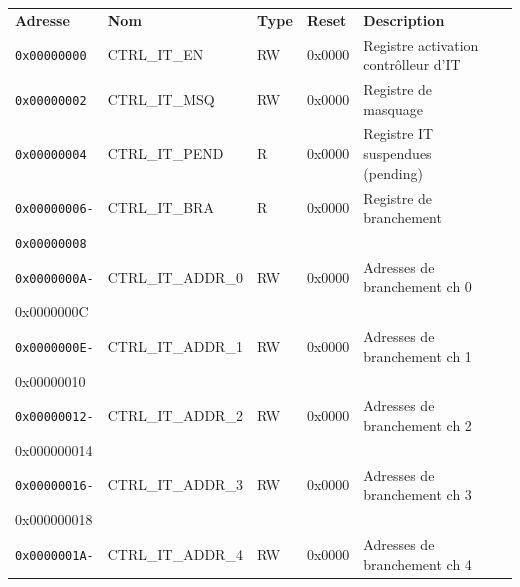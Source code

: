 \begin{table}[H]
	\centering
	\begin{tabular}{llllll}
		\hline
		\addlinespace[1ex] %
		\textbf{Adresse}     & \textbf{Nom}           & \textbf{Type} & \textbf{Reset} & \textbf{Description}                 \\
		\rhline
		\texttt{0x00000000}  & CTRL\_IT\_EN           & RW            & 0x0000         & Registre activation contrôlleur d'IT \\
		\rhline
		\texttt{0x00000002}  & CTRL\_IT\_MSQ          & RW            & 0x0000         & Registre de masquage                 \\
		\rhline
		\texttt{0x00000004}  & CTRL\_IT\_PEND         & R             & 0x0000         & Registre IT suspendues (pending)     \\
		\rhline
		\texttt{0x00000006-} & CTRL\_IT\_BRA          & R             & 0x0000         & Registre de branchement              \\
		\texttt{0x00000008}  &                        &               &                &                                      \\
		\rhline
		\texttt{0x0000000A-} & CTRL\_IT\_ADDR\_0      & RW            & 0x0000         & Adresses de branchement ch 0         \\
		{0x0000000C}         &                        &               &                &                                      \\
		\rhline
		\texttt{0x0000000E-} & CTRL\_IT\_ADDR\_1      & RW            & 0x0000         & Adresses de branchement ch 1         \\
		{0x00000010}         &                        &               &                &                                      \\
		\rhline
		\texttt{0x00000012-} & CTRL\_IT\_ADDR\_2      & RW            & 0x0000         & Adresses de branchement ch 2         \\
		{0x000000014}        &                        &               &                &                                      \\
		\rhline
		\texttt{0x00000016-} & CTRL\_IT\_ADDR\_3      & RW            & 0x0000         & Adresses de branchement ch 3         \\
		{0x000000018}        &                        &               &                &                                      \\
		\rhline
		\texttt{0x0000001A-} & CTRL\_IT\_ADDR\_4      & RW            & 0x0000         & Adresses de branchement ch 4         \\

\end{tabular}
\end{table}
